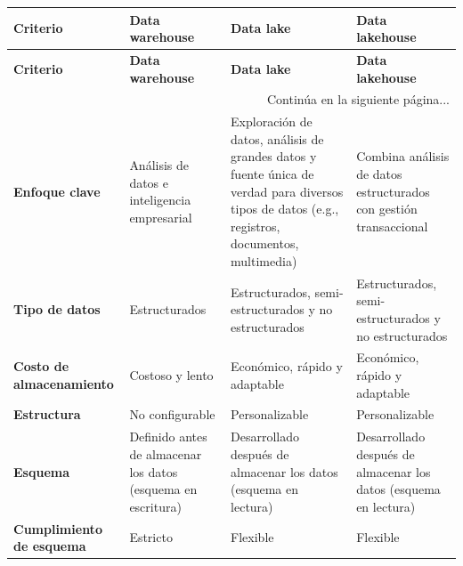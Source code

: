 \begin{longtable}{|p{3cm}|p{4cm}|p{4cm}|p{4cm}|}
    \hline
    \textbf{Criterio}         & \textbf{Data warehouse}                                   & \textbf{Data lake}                                                       & \textbf{Data lakehouse}                                                  \\ \hline
    \endfirsthead
    \hline
    \textbf{Criterio}         & \textbf{Data warehouse}                                   & \textbf{Data lake}                                                       & \textbf{Data lakehouse}                                                  \\ \hline
    \endhead
    \hline
    \multicolumn{4}{|r|}{Continúa en la siguiente página...} \\ \hline
    \endfoot
    \hline
    \endlastfoot
    \textbf{Enfoque clave}    & Análisis de datos e inteligencia empresarial                & Exploración de datos, análisis de grandes datos y fuente única de verdad para diversos tipos de datos (e.g., registros, documentos, multimedia) & Combina análisis de datos estructurados con gestión transaccional            \\ \hline
    \textbf{Tipo de datos}    & Estructurados                                               & Estructurados, semi-estructurados y no estructurados                         & Estructurados, semi-estructurados y no estructurados                         \\ \hline
    \textbf{Costo de almacenamiento}            & Costoso y lento                                             & Económico, rápido y adaptable                                                & Económico, rápido y adaptable                                                \\ \hline
    \textbf{Estructura}       & No configurable                                             & Personalizable                                                               & Personalizable                                                               \\ \hline
    \textbf{Esquema}          & Definido antes de almacenar los datos (esquema en escritura) & Desarrollado después de almacenar los datos (esquema en lectura)             & Desarrollado después de almacenar los datos (esquema en lectura)             \\ \hline
    \textbf{Cumplimiento de esquema} & Estricto                                              & Flexible                                                                     & Flexible                                                                     \\ \hline

\end{longtable}
